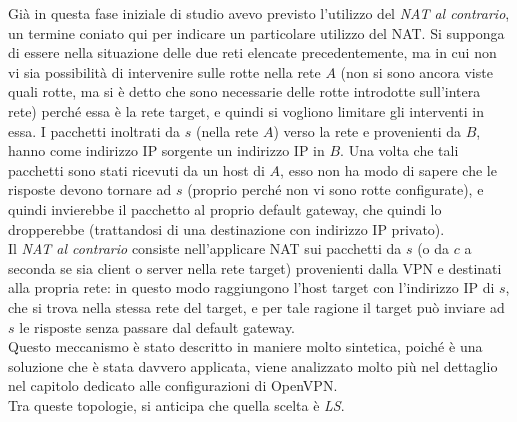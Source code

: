 Già in questa fase iniziale di studio avevo previsto l'utilizzo del \textit{NAT al contrario},
un termine coniato qui per indicare un particolare utilizzo del NAT. Si supponga di
essere nella situazione delle due reti elencate precedentemente, ma in cui non vi sia
possibilità di intervenire sulle rotte nella rete $A$ (non si sono ancora viste quali rotte,
ma si è detto che sono necessarie delle rotte introdotte sull'intera rete) perché essa è
la rete target, e quindi si vogliono limitare gli interventi in essa.
I pacchetti inoltrati da $s$ (nella rete $A$) verso la rete e provenienti da $B$, hanno
come indirizzo IP sorgente un indirizzo IP in $B$. Una volta che tali pacchetti
sono stati ricevuti da un host di $A$, esso non ha modo di sapere che le risposte devono
tornare ad $s$ (proprio perché non vi sono rotte configurate), e quindi invierebbe il
pacchetto al proprio default gateway, che quindi lo dropperebbe (trattandosi di una
destinazione con indirizzo IP privato).\\
Il \textit{NAT al contrario} consiste nell'applicare NAT sui pacchetti
da $s$ (o da $c$ a seconda se sia client o server nella rete target) provenienti dalla
VPN e destinati alla propria rete: in questo modo raggiungono l'host target con l'indirizzo IP
di $s$, che si trova nella stessa rete del target, e per tale ragione il target può
inviare ad $s$ le risposte senza passare dal default gateway.\\
Questo meccanismo è stato descritto in maniere molto sintetica, poiché è una soluzione che è stata
davvero applicata, viene analizzato molto più nel dettaglio nel capitolo dedicato alle configurazioni
di OpenVPN.\\
Tra queste topologie, si anticipa che quella scelta è \textit{LS}.



